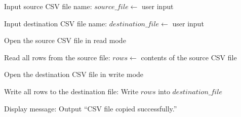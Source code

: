 \begin{algorithm}
\caption{Copy Contents of One CSV File to Another CSV File}
\begin{algorithmic}[1]

\STATE Input source CSV file name:
\STATE $source\_file \gets$ user input

\STATE Input destination CSV file name:
\STATE $destination\_file \gets$ user input

\STATE Open the source CSV file in read mode

\STATE Read all rows from the source file:
\STATE $rows \gets$ contents of the source CSV file

\STATE Open the destination CSV file in write mode

\STATE Write all rows to the destination file:
\STATE Write $rows$ into $destination\_file$

\STATE Display message:
\STATE Output ``CSV file copied successfully.''

\end{algorithmic}
\end{algorithm}